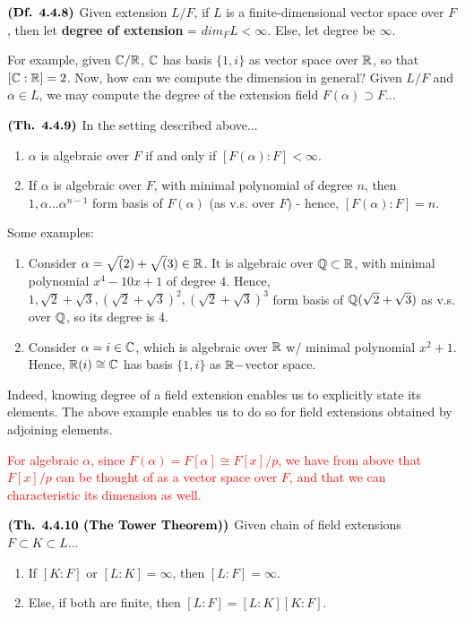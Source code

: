 \documentclass{article}
\begin{document}
$\textbf{(Df. 4.4.8)}$ Given extension $L/F$, if $L$ is a finite-dimensional vector space over $F$, then let \textbf{degree of extension} = $dim_{F}L < \infty$. Else, let degree be $\infty$.

For example, given $\mathbb{C}/\mathbb{R}$, $\mathbb{C}$ has basis $\{1,i\}$ as vector space over $\mathbb{R}$, so that $[\mathbb{C}:\mathbb{R}]=2$. Now, how can we compute the dimension in general? Given $L/F$ and $\alpha \in L$, we may compute the degree of the extension field $F(\alpha) \supset F$...

$\textbf{(Th. 4.4.9)}$ In the setting described above...
\begin{enumerate}
    \item $\alpha$ is algebraic over $F$ if and only if $[F(\alpha):F] < \infty$.
    \item If $\alpha$ is algebraic over $F$, with minimal polynomial of degree $n$, then $1,\alpha...\alpha^{n-1}$ form basis of $F(\alpha)$ (as v.s. over $F$) - hence, $[F(\alpha):F] = n$.
\end{enumerate}

Some examples:
\begin{enumerate}
    \item Consider $\alpha = \sqrt(2) + \sqrt(3) \in \mathbb{R}$. It is algebraic over $\mathbb{Q} \subset \mathbb{R}$, with minimal polynomial $x^4 - 10x + 1$ of degree $4$. Hence, $1,\sqrt{2} + \sqrt{3}, (\sqrt{2} + \sqrt{3})^2, (\sqrt{2} + \sqrt{3})^3 $ form basis of $\mathbb{Q}(\sqrt{2} + \sqrt{3})$ as v.s. over $\mathbb{Q}$, so its degree is $4$.
    \item Consider $\alpha = i \in \mathbb{C}$, which is algebraic over $\mathbb{R}$ w/ minimal polynomial $x^2 + 1$. Hence, $\mathbb{R}(i) \cong \mathbb{C}$ has basis $\{1,i\}$ as $\mathbb{R}-$vector space.  
\end{enumerate}

Indeed, knowing degree of a field extension enables us to explicitly state its elements. The above example enables us to do so for field extensions obtained by adjoining elements.

\textcolor{red}{For algebraic $\alpha$, since $ F(\alpha) = F[\alpha] \cong F[x]/p$, we have from above that $F[x]/p$ can be thought of as a vector space over $F$, and that we can characteristic its dimension as well.}

$\textbf{(Th. 4.4.10 (The Tower Theorem))}$ Given chain of field extensions $F \subset K \subset L$...
\begin{enumerate}
    \item If $[K:F]$ or $[L:K] = \infty$, then $[L:F] = \infty$.
    \item Else, if both are finite, then $[L:F] = [L:K][K:F]$.
\end{enumerate}
\end{document}
